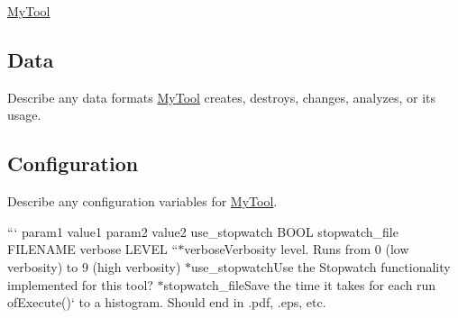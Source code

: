\hyperlink{classMyTool}{My\-Tool}

\subsection*{Data}

Describe any data formats \hyperlink{classMyTool}{My\-Tool} creates, destroys, changes, analyzes, or its usage.

\subsection*{Configuration}

Describe any configuration variables for \hyperlink{classMyTool}{My\-Tool}.

``` param1 value1 param2 value2 use\-\_\-stopwatch B\-O\-O\-L stopwatch\-\_\-file F\-I\-L\-E\-N\-A\-M\-E verbose L\-E\-V\-E\-L ``{\ttfamily  $\ast$}verbose{\ttfamily Verbosity level. Runs from 0 (low verbosity) to 9 (high verbosity) $\ast$}use\-\_\-stopwatch{\ttfamily Use the Stopwatch functionality implemented for this tool? $\ast$}stopwatch\-\_\-file{\ttfamily Save the time it takes for each run of}Execute()` to a histogram. Should end in .pdf, .eps, etc. 